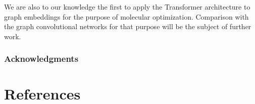 \documentclass{article}
\begin{document}
We are also to our knowledge the first to apply the Transformer architecture to graph embeddings for the purpose of molecular optimization. Comparison with the graph convolutional networks for that purpose will be the subject of further work.


\subsubsection*{Acknowledgments}

\section*{References}
\medskip

\small
 

\end{document}
